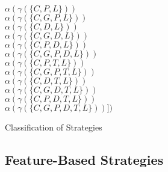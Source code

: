 \begin{frame}{\myframetitle}
\begin{mycolumns}
{{				$\alpha(\gamma(\{C,P,L\}))$\\
				$\alpha(\gamma(\{C,G,P,L\}))$\\
				$\alpha(\gamma(\{C,D,L\}))$\\
				$\alpha(\gamma(\{C,G,D,L\}))$\\
				$\alpha(\gamma(\{C,P,D,L\}))$\\
				$\alpha(\gamma(\{C,G,P,D,L\}))$\\
				$\alpha(\gamma(\{C,P,T,L\}))$\\
				$\alpha(\gamma(\{C,G,P,T,L\}))$\\
				$\alpha(\gamma(\{C,D,T,L\}))$\\
				$\alpha(\gamma(\{C,G,D,T,L\}))$\\
				$\alpha(\gamma(\{C,P,D,T,L\}))$\\
				$\alpha(\gamma(\{C,G,P,D,T,L\}))])$
			}
		}
	\end{mycolumns}
\end{frame}

\begin{frame}{Classification of Strategies}
	\begin{mycolumns}[t,columns=3,animation=none]
		\summaryproductbased
	\mynextcolumn
	\mynextcolumn
	\end{mycolumns}
\end{frame}

\subsection{Feature-Based Strategies}

\begin{frame}{\myframetitle}
	\begin{mycolumns}
	\mynextcolumn
	\end{mycolumns}
\end{frame}

